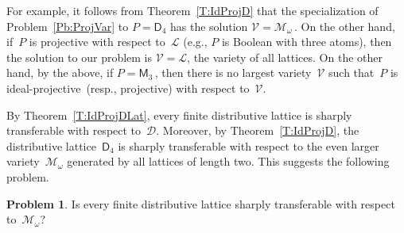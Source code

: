 \documentclass[reqno]{amsart}
\numberwithin{equation}{section}
\theoremstyle{plain}
\theoremstyle{definition}
\newtheorem{problem}{Problem}
\theoremstyle{remark}
\numberwithin{figure}{section}
\numberwithin{table}{section}
\begin{document}
For example, it follows from Theorem~\ref{T:IdProjD} that the specialization of Problem~\ref{Pb:ProjVar} to $P={\mathsf{D}_{4}}$ has the solution ${\mathcal{V}}={\mathcal{M}}_{\omega}$\,.
On the other hand, if~$P$ is projective with respect to~${\mathcal{L}}$ (e.g., $P$ is Boolean with three atoms), then the solution to our problem is ${\mathcal{V}}={\mathcal{L}}$, the variety of all lattices.
On the other hand, by the above, if $P={{\mathsf{M}}}_3$\,, then there is no largest variety~${\mathcal{V}}$ such that~$P$ is {i\-de\-al-pro\-jec\-tive}\ (resp., projective) with respect to~${\mathcal{V}}$.

By Theorem~\ref{T:IdProjDLat}, every finite distributive lattice is sharply transferable with respect to~${\mathcal{D}}$.
Moreover, by Theorem~\ref{T:IdProjD}, the distributive lattice~${\mathsf{D}_{4}}$ is sharply transferable with respect to the even larger variety~${\mathcal{M}}_{\omega}$ generated by all lattices of length two.
This suggests the following problem.

\begin{problem}\label{Pb:DMgoidproj}
Is every finite distributive lattice sharply transferable with respect to~${\mathcal{M}}_{\omega}$?
\end{problem}

\providecommand{\noopsort}[1]{}
  
\end{document}
